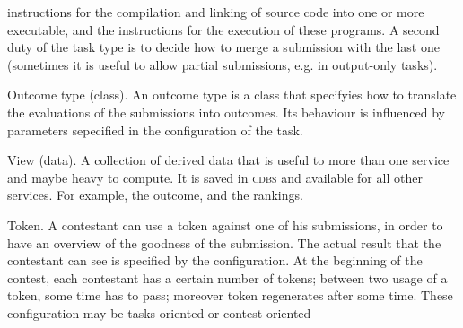 \documentclass[a4paper,8pt]{amsart}
\newcommand{\CDBS}{\textsc{cdbs}}
\newenvironment{squishlist}{%
  \begin{list}{\textbullet}%
    { \setlength{\itemsep}{0pt}%
      \setlength{\parsep}{3pt}%
      \setlength{\topsep}{3pt}%
      \setlength{\partopsep}{0pt}%
      \setlength{\leftmargin}{1.5em}%
      \setlength{\labelwidth}{1em}%
      \setlength{\labelsep}{0.5em} }%
}{\end{list}}
\begin{document}
\begin{multicols}{2}
\begin{squishlist}
    instructions for the compilation and linking of source code into
    one or more executable, and the instructions for the execution of
    these programs. A second duty of the task type is to decide how to
    merge a submission with the last one (sometimes it is useful to
    allow partial submissions, e.g. in output-only tasks).
  \item[Outcome type (class).] An outcome type is a class that
    specifyies how to translate the evaluations of the submissions
    into outcomes. Its behaviour is influenced by parameters
    sepecified in the configuration of the task.
  \item[View (data).] A collection of derived data that is useful to
    more than one service and maybe heavy to compute. It is saved in
    \CDBS{} and available for all other services. For example, the
    outcome, and the rankings.
  \item[Token.] A contestant can use a token against one of his
    submissions, in order to have an overview of the goodness of the
    submission. The actual result that the contestant can see is
    specified by the configuration. At the beginning of the contest,
    each contestant has a certain number of tokens; between two usage
    of a token, some time has to pass; moreover token regenerates
    after some time. These configuration may be tasks-oriented or
    contest-oriented
  \end{squishlist}
\end{multicols}
\end{document}
